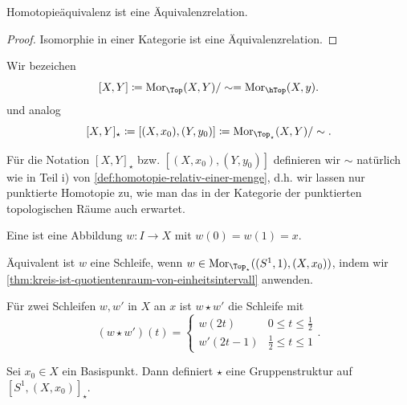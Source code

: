 \begin{lemma}\label{lm:homotopieäquivalenz-ist-äquivalenzrelation}
Homotopieäquivalenz ist eine Äquivalenzrelation.    
\end{lemma}

\begin{proof}
    Isomorphie in einer Kategorie ist eine Äquivalenzrelation.
\end{proof}


\begin{notation}
    Wir bezeichen
    \[
        [X,Y] \coloneqq  \Mor_{\Top}(X,Y) / \sim = \Mor_{\hTop}(X,y)
    .\] 
    und analog
    \[
        [X,Y]_{\star} \coloneqq  [(X,x_0),(Y,y_0)] \coloneqq  \Mor_{\Top_{\star}}(X,Y) / \sim 
    .\] 
\end{notation}

\begin{remark*}
    Für die Notation $[X,Y]_{\star}$ bzw. $[(X,x_0),(Y,y_0)]$ definieren wir $\sim $ natürlich wie in Teil i) von \autoref{def:homotopie-relativ-einer-menge}, d.h. wir lassen nur punktierte Homotopie zu, wie man das in der Kategorie der punktierten topologischen Räume auch erwartet.
\end{remark*}

\begin{definition}[Schleife]\label{def:schleife}
    Eine  ist eine Abbildung $w\colon  I \to  X$ mit $w(0) = w(1) = x$. 

    Äquivalent ist  $w$ eine Schleife, wenn  $w\in \Mor_{\Top_{\star}}((S^1,1), (X,x_0))$, indem wir \autoref{thm:kreis-ist-quotientenraum-von-einheitsintervall} anwenden.
\end{definition}


\begin{definition}\label{def:komposition-von-schleifen}
    Für zwei Schleifen $w,w'$ in  $X$ an  $x$ ist  $w \star w'$ die Schleife mit
     \[
         (w \star w')(t) = \begin{cases}
             w(2t) & 0\leq t\leq \frac{1}{2} \\
             w'(2t-1) & \frac{1}{2}\leq t\leq 1
         \end{cases}
    .\] 
\end{definition}

\begin{theorem}\label{thm:star-ist-gruppenstruktur}
    Sei $x_0\in X$ ein Basispunkt. Dann definiert $\star$ eine Gruppenstruktur auf  $[S^1,(X,x_0)]_{\star}$.
\end{theorem}


